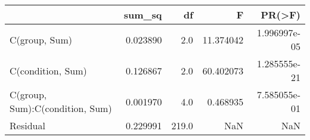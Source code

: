 \begin{tabular}{lrrrr}
\toprule
{} &    sum\_sq &     df &          F &        PR(>F) \\
\midrule
C(group, Sum)                   &  0.023890 &    2.0 &  11.374042 &  1.996997e-05 \\
C(condition, Sum)               &  0.126867 &    2.0 &  60.402073 &  1.285555e-21 \\
C(group, Sum):C(condition, Sum) &  0.001970 &    4.0 &   0.468935 &  7.585055e-01 \\
Residual                        &  0.229991 &  219.0 &        NaN &           NaN \\
\bottomrule
\end{tabular}